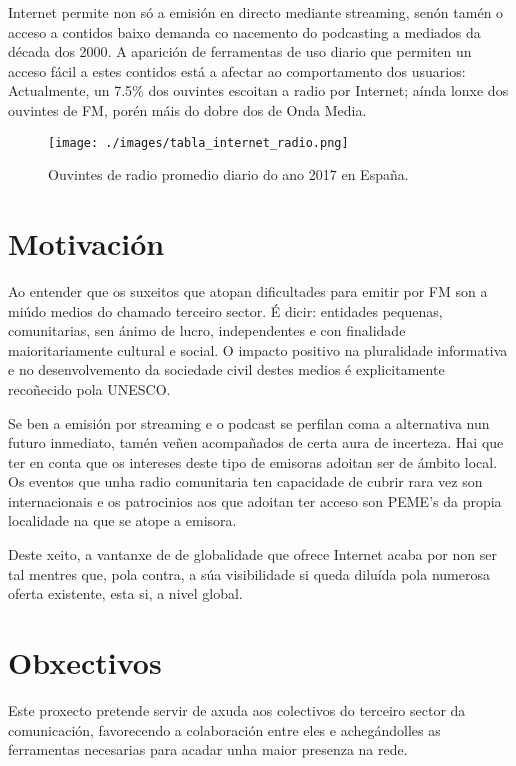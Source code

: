 Internet permite non só a emisión en directo mediante streaming, senón tamén o acceso a contidos baixo demanda co nacemento do podcasting a mediados da década dos 2000\cite{guardian}. A aparición de ferramentas de uso diario que permiten un acceso fácil a estes contidos está a afectar ao comportamento dos usuarios: Actualmente, un 7.5\% dos ouvintes escoitan a radio por Internet; aínda lonxe dos ouvintes de FM, porén máis do dobre dos de Onda Media\cite{EGM}.

\begin{figure}[H]
	\centering
	\texttt{[image: ./images/tabla\_internet\_radio.png]}
  	\caption{Ouvintes de radio promedio diario do ano 2017 en España.}
	\label{fig:table_egm}
\end{figure}

\section{Motivación}

Ao entender que os suxeitos que atopan dificultades para emitir por FM son a miúdo medios do chamado terceiro sector. É dicir: entidades pequenas, comunitarias, sen ánimo de lucro, independentes e con finalidade maioritariamente cultural e social\cite{fesp}. O impacto positivo na pluralidade informativa e no desenvolvemento da sociedade civil destes medios é explicitamente recoñecido pola UNESCO\cite{unesco}. 

Se ben a emisión por streaming e o podcast se perfilan coma a alternativa nun futuro inmediato, tamén veñen acompañados de certa aura de incerteza. Hai que ter en conta que os intereses deste tipo de emisoras adoitan ser de ámbito local. Os eventos que unha radio comunitaria ten capacidade de cubrir rara vez son internacionais e os patrocinios aos que adoitan ter acceso son PEME's da propia localidade na que se atope a emisora. 

Deste xeito, a vantanxe de de globalidade que ofrece Internet acaba por non ser tal mentres que, pola contra, a súa visibilidade si queda diluída pola numerosa oferta existente, esta si, a nivel global.



\section{Obxectivos}

Este proxecto pretende servir de axuda aos colectivos do terceiro sector da comunicación, favorecendo a colaboración entre eles e achegándolles as ferramentas necesarias para acadar unha maior presenza na rede.

